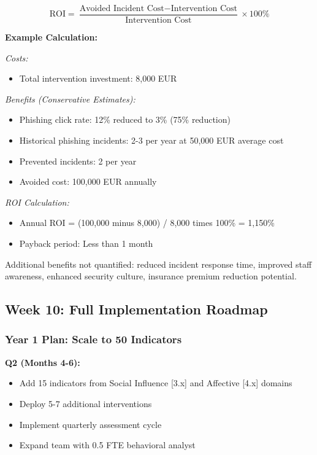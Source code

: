 \documentclass[11pt,a4paper]{article}
\begin{document}
\begin{equation}
\text{ROI} = \frac{\text{Avoided Incident Cost} - \text{Intervention Cost}}{\text{Intervention Cost}} \times 100\%
\end{equation}

\textbf{Example Calculation:}

\textit{Costs:}
\begin{itemize}
\item Total intervention investment: 8,000 EUR
\end{itemize}

\textit{Benefits (Conservative Estimates):}
\begin{itemize}
\item Phishing click rate: 12\% reduced to 3\% (75\% reduction)
\item Historical phishing incidents: 2-3 per year at 50,000 EUR average cost
\item Prevented incidents: 2 per year
\item Avoided cost: 100,000 EUR annually
\end{itemize}

\textit{ROI Calculation:}
\begin{itemize}
\item Annual ROI = (100,000 minus 8,000) / 8,000 times 100\% = 1,150\%
\item Payback period: Less than 1 month
\end{itemize}

Additional benefits not quantified: reduced incident response time, improved staff awareness, enhanced security culture, insurance premium reduction potential.

\subsection{Week 10: Full Implementation Roadmap}

\subsubsection{Year 1 Plan: Scale to 50 Indicators}

\textbf{Q2 (Months 4-6):}
\begin{itemize}
\item Add 15 indicators from Social Influence [3.x] and Affective [4.x] domains
\item Deploy 5-7 additional interventions
\item Implement quarterly assessment cycle
\item Expand team with 0.5 FTE behavioral analyst
\end{itemize}
\end{document}
